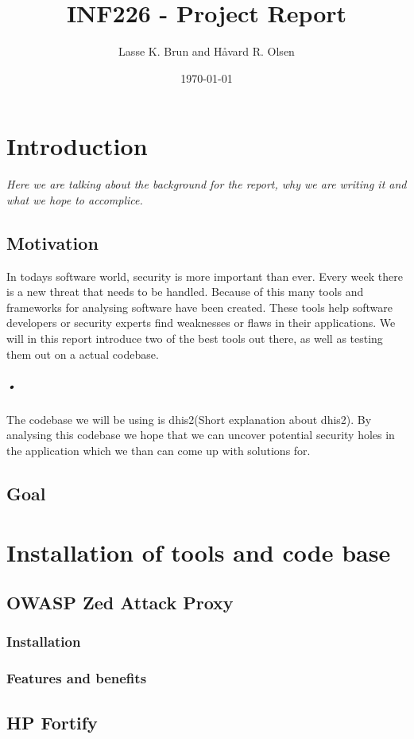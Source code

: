 \documentclass[11pt,english,a4paper]{report}
\title{INF226 - Project Report}
\date{\today}
\author{Lasse K. Brun and Håvard R. Olsen}
\begin{document}
\maketitle


\chapter{Introduction}
\textit{Here we are talking about the background for the report, why we are writing it and what we hope to accomplice.}

\section{Motivation}
In todays software world, security is more important than ever. Every week there is a new threat that needs to be handled. Because of this many tools and frameworks for analysing software have been created. These tools help software developers or security experts find weaknesses or flaws in their applications. We will in this report introduce two of the best tools out there, as well as testing them out on a actual codebase. 
\paragraph{•}
The codebase we will be using is dhis2(Short explanation about dhis2). By analysing this codebase we hope that we can uncover potential security holes in the application which we than can come up with solutions for.

\section{Goal}
\chapter{Installation of tools and code base}
\section{OWASP Zed Attack Proxy}
\subsection{Installation}
\subsection{Features and benefits}
\section{HP Fortify}
\end{document}
